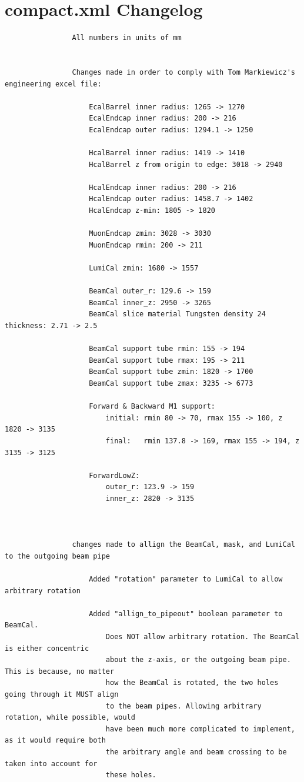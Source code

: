 \documentclass{report}
\begin{document}
        \section{compact.xml Changelog} \label{sect:compact_changes}
            \begin{verbatim}
                All numbers in units of mm


                Changes made in order to comply with Tom Markiewicz's engineering excel file:

                    EcalBarrel inner radius: 1265 -> 1270
                    EcalEndcap inner radius: 200 -> 216
                    EcalEndcap outer radius: 1294.1 -> 1250

                    HcalBarrel inner radius: 1419 -> 1410
                    HcalBarrel z from origin to edge: 3018 -> 2940

                    HcalEndcap inner radius: 200 -> 216
                    HcalEndcap outer radius: 1458.7 -> 1402
                    HcalEndcap z-min: 1805 -> 1820

                    MuonEndcap zmin: 3028 -> 3030
                    MuonEndcap rmin: 200 -> 211

                    LumiCal zmin: 1680 -> 1557

                    BeamCal outer_r: 129.6 -> 159
                    BeamCal inner_z: 2950 -> 3265
                    BeamCal slice material Tungsten density 24 thickness: 2.71 -> 2.5
                    
                    BeamCal support tube rmin: 155 -> 194
                    BeamCal support tube rmax: 195 -> 211
                    BeamCal support tube zmin: 1820 -> 1700
                    BeamCal support tube zmax: 3235 -> 6773

                    Forward & Backward M1 support:
                        initial: rmin 80 -> 70, rmax 155 -> 100, z 1820 -> 3135
                        final:   rmin 137.8 -> 169, rmax 155 -> 194, z 3135 -> 3125

                    ForwardLowZ:
                        outer_r: 123.9 -> 159
                        inner_z: 2820 -> 3135



                changes made to allign the BeamCal, mask, and LumiCal to the outgoing beam pipe

                    Added "rotation" parameter to LumiCal to allow arbitrary rotation

                    Added "allign_to_pipeout" boolean parameter to BeamCal. 
                        Does NOT allow arbitrary rotation. The BeamCal is either concentric 
                        about the z-axis, or the outgoing beam pipe. This is because, no matter
                        how the BeamCal is rotated, the two holes going through it MUST align 
                        to the beam pipes. Allowing arbitrary rotation, while possible, would
                        have been much more complicated to implement, as it would require both
                        the arbitrary angle and beam crossing to be taken into account for 
                        these holes.


\end{verbatim}
\end{document}
